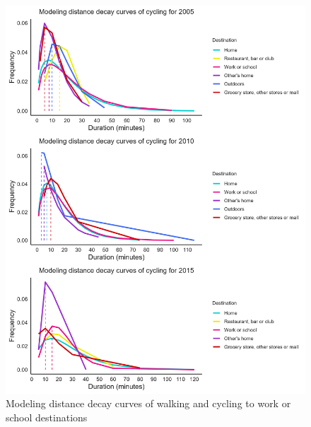 \documentclass[
11pt, %
oneside, %
english, %
singlespacing, %
]{macthesis} %
\begin{document}
\begin{figure}

{\centering \includegraphics[width=1\linewidth]{figure/ch03_fig_14} 

}

\caption{Modeling distance decay curves of walking and cycling to work or school destinations}\label{fig:ch03-plot-fig-14}
\end{figure}
\end{document}
